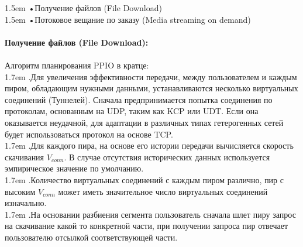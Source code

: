 \documentclass[10pt,a4paper]{article}
\begin{document}
\hangindent 1.5em
\noindent   
•\quad Получение файлов (File Download)
\vspace{-0.8em}
\\ 

\hangindent 1.5em
\noindent   
•\quad Потоковое вещание по заказу (Media streaming on demand)\cite{article4}
\vspace{-1.5em}
\\ 

\noindent
\\{\bf Получение файлов (File Download):}
\vspace{-0.6em}
\\\\Алгоритм планирования PPIO в кратце:
\vspace{-0.6em}
\\ 

\hangindent 1.7em
.\quad Для увеличения эффективности передачи, между пользователем и каждым пиром, обладающим нужными данными, устанавливаются несколько виртуальных соединений (Туннелей). Сначала предпринимается попытка соединения по протоколам, основанным на UDP, таким как KCP или UDT\cite{article13}. Если она оказывается неудачной, для адаптации в различных типах гетерогенных сетей будет использоваться протокол на основе TCP.
\vspace{-0.8em}
\\ 

\hangindent 1.7em
.\quad Для каждого пира, на основе его истории передачи вычисляется скорость скачивания $V_{conn}$. В случае отсутствия исторических данных используется эмпирическое значение по умолчанию.
\vspace{-0.8em}
\\ 

\hangindent 1.7em
.\quad Количество виртуальных соединений с каждым пиром различно, пир с высоким $V_{conn}$ может иметь значительное число виртуальных соединений изначально.
\vspace{-0.8em}
\\ 

\hangindent 1.7em
.\quad На основании разбиения сегмента пользователь сначала шлет пиру запрос на скачивание какой то конкретной части, при получении запроса пир отвечает пользователю отсылкой соответствующей части.
\vspace{-0.8em}
\\ 
\end{document}
